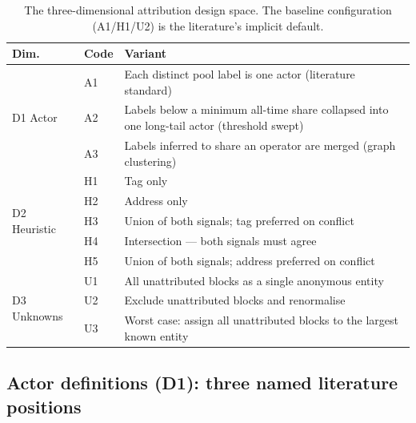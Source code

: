 \documentclass[logo,msc]{infthesis}           %
\begin{document}
\begin{table}[t]
  \centering
  \caption{The three-dimensional attribution design space. The baseline
  configuration (A1/H1/U2) is the literature's implicit default.}
  \label{tab:designspace}
  \begin{tabular}{llp{8.2cm}}
    \toprule
    Dim. & Code & Variant \\
    \midrule
    \multirow{3}{*}{D1 Actor}
      & A1 & Each distinct pool label is one actor (literature standard) \\
      & A2 & Labels below a minimum all-time share collapsed into one long-tail actor (threshold swept) \\
      & A3 & Labels inferred to share an operator are merged (graph clustering) \\
    \midrule
    \multirow{5}{*}{D2 Heuristic}
      & H1 & Tag only \\
      & H2 & Address only \\
      & H3 & Union of both signals; tag preferred on conflict \\
      & H4 & Intersection --- both signals must agree \\
      & H5 & Union of both signals; address preferred on conflict \\
    \midrule
    \multirow{3}{*}{D3 Unknowns}
      & U1 & All unattributed blocks as a single anonymous entity \\
      & U2 & Exclude unattributed blocks and renormalise \\
      & U3 & Worst case: assign all unattributed blocks to the largest known entity \\
    \bottomrule
  \end{tabular}
\end{table}
 
\subsection{Actor definitions (D1): three named literature positions}
 
\end{document}
